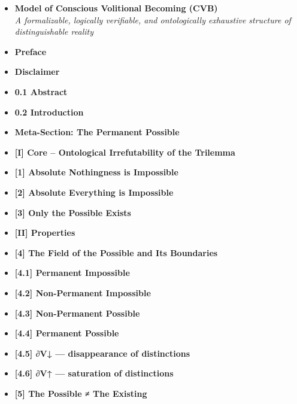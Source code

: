 \documentclass[12pt]{article}
\begin{document}
\begin{itemize}
\item \textbf{Model of Conscious Volitional Becoming (CVB)} \\
\textit{A formalizable, logically verifiable, and ontologically exhaustive structure of distinguishable reality}

\item \textbf{Preface}

\item \textbf{Disclaimer}

\item \textbf{0.1 Abstract}

\item \textbf{0.2 Introduction}

\item \textbf{Meta-Section: The Permanent Possible}

\item \textbf{[I] Core – Ontological Irrefutability of the Trilemma}

\item \textbf{[1] Absolute Nothingness is Impossible}

\item \textbf{[2] Absolute Everything is Impossible}

\item \textbf{[3] Only the Possible Exists}

\item \textbf{[II] Properties}

\item \textbf{[4] The Field of the Possible and Its Boundaries}

\item \textbf{[4.1] Permanent Impossible}

\item \textbf{[4.2] Non-Permanent Impossible}

\item \textbf{[4.3] Non-Permanent Possible}

\item \textbf{[4.4] Permanent Possible}

\item \textbf{[4.5] ∂V↓ — disappearance of distinctions}

\item \textbf{[4.6] ∂V↑ — saturation of distinctions}

\item \textbf{[5] The Possible ≠ The Existing}


\end{itemize}
\end{document}
